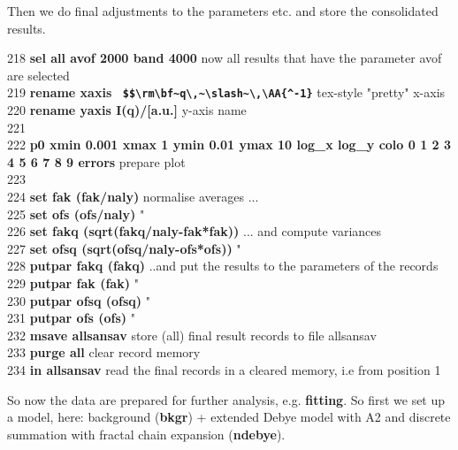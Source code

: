 \documentclass[11pt,fleqn]{book} %
\newcommand{\expl}[1]{\hskip 0.5cm {\color{explgray} #1}}
\begin{document}
Then we do final adjustments to the parameters etc. and store the consolidated
results.

\begin{corollary}
218 {\bf sel all avof 2000 band 4000} \expl{now all results that have the parameter avof are selected} \\
219 {\bf rename xaxis \verb! $$\rm\bf~q\,~\slash~\,\AA{^-1}! } \expl{tex-style "pretty" x-axis}\\
220 {\bf rename yaxis  I(q)/[a.u.]} \expl{y-axis name} \\
221 \\
222 {\bf p0 xmin 0.001 xmax 1 ymin 0.01 ymax 10 log\_x log\_y colo 0 1 2 3 4 5 6 7 8 9 errors} 
\expl{prepare plot} \\
223 \\
224 {\bf set fak  (fak/naly) } \expl{normalise averages ...}\\
225 {\bf set ofs  (ofs/naly) } \expl{  " }\\
226 {\bf set fakq (sqrt(fakq/naly-fak*fak))} \expl{... and compute variances } \\
227 {\bf set ofsq (sqrt(ofsq/naly-ofs*ofs))} \expl{  " }\\
228 {\bf putpar fakq (fakq) } \expl{..and put the results to the parameters of the records}\\
229 {\bf putpar fak  (fak)} \expl{ " } \\
230 {\bf putpar ofsq (ofsq)} \expl{ " }  \\
231 {\bf putpar ofs  (ofs)} \expl{ " }  \\
232 {\bf msave allsansav } \expl{store (all) final result records to file allsansav}\\
233 {\bf purge all} \expl{clear record memory}\\
234 {\bf in allsansav } \expl{read the final records in a cleared memory, i.e from position 1}
\end{corollary}

So now the data are prepared for further analysis, e.g. {\bf fitting}.
So first we set up a model, here: background ({\bf bkgr}) + extended Debye model with A2 and discrete
summation with fractal chain expansion ({\bf ndebye}).
\end{document}
